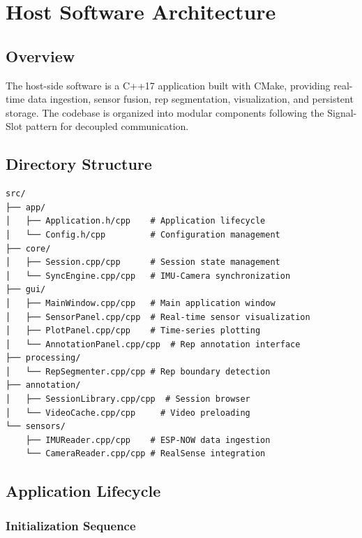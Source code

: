 
\chapter{Host Software Architecture} \label{chap:host}

\section{Overview}

The host-side software is a C++17 application built with CMake, providing real-time data ingestion, sensor fusion, rep segmentation, visualization, and persistent storage. The codebase is organized into modular components following the Signal-Slot pattern for decoupled communication.

\section{Directory Structure}

\begin{verbatim}
src/
├── app/
│   ├── Application.h/cpp    # Application lifecycle
│   └── Config.h/cpp         # Configuration management
├── core/
│   ├── Session.cpp/cpp      # Session state management
│   └── SyncEngine.cpp/cpp   # IMU-Camera synchronization
├── gui/
│   ├── MainWindow.cpp/cpp   # Main application window
│   ├── SensorPanel.cpp/cpp  # Real-time sensor visualization
│   ├── PlotPanel.cpp/cpp    # Time-series plotting
│   └── AnnotationPanel.cpp/cpp  # Rep annotation interface
├── processing/
│   └── RepSegmenter.cpp/cpp # Rep boundary detection
├── annotation/
│   ├── SessionLibrary.cpp/cpp  # Session browser
│   └── VideoCache.cpp/cpp     # Video preloading
└── sensors/
    ├── IMUReader.cpp/cpp    # ESP-NOW data ingestion
    └── CameraReader.cpp/cpp # RealSense integration
\end{verbatim}

\section{Application Lifecycle}

\subsection{Initialization Sequence}

